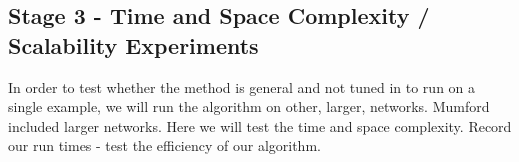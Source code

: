 \subsection{Stage 3 - Time and Space Complexity / Scalability Experiments}

In order to test whether the method is general and not tuned in to run on a single example, we will run the algorithm on other, larger, networks. Mumford included larger networks. Here we will test the time and space complexity.
Record our run times - test the efficiency of our algorithm.


